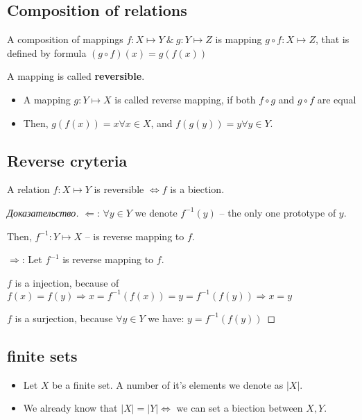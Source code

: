 \subsection{Composition of relations}

\begin{definition}[]
	A composition of mappings $f: X \mapsto Y \ \& \ g: Y \mapsto Z$ is mapping $g \circ f: X \mapsto Z$, that is defined by formula $(g \circ f) (x) = g(f(x))$
\end{definition}

A mapping is called \textbf{reversible}.

\begin{itemize}
	\item \begin{definition}[]
			A mapping $g: Y \mapsto X$ is called reverse mapping, if both $f \circ g$ and $g \circ f$ are equal
		\end{definition}
	\item Then, $g(f(x)) = x \forall x \in X$, and $f(g(y)) = y \forall y \in Y$. 
\end{itemize}

\subsection{Reverse cryteria}

\begin{theorem}[]
	A relation $f: X \mapsto Y$ is reversible $\Leftrightarrow f$ is a biection.
\end{theorem}

\begin{proof}[Доказательство]
	$ \Leftarrow $: $\forall y \in Y$ we denote $f^{-1}(y)$ -- the only one prototype of $y$.
	
Then, $f^{-1}: Y \mapsto X$ -- is reverse mapping to $f$.

$ \Rightarrow $: Let $f^{-1}$ is reverse mapping to $f$.

$f$ is a injection, because of $f(x) = f(y) \Rightarrow x = f^{-1}(f(x)) = y = f^{-1}(f(y)) \Rightarrow x = y$ 

$f$ is a surjection, because $\forall y \in Y$ we have: $y = f^{-1}(f(y))$ 
\end{proof}

\subsection{finite sets}

\begin{itemize}
	\item Let $X$ be a finite set. A number of it's elements we denote as $|X|$.
	\item We already know that $|X| = |Y| \Leftrightarrow $ we can set a biection between $X, Y$. 
\end{itemize}

